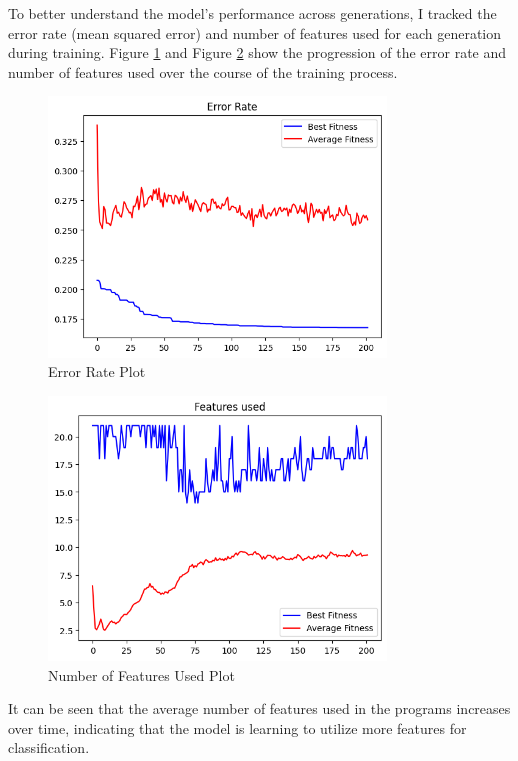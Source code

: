 \documentclass{article}
\begin{document}
To better understand the model's performance across generations, I tracked the error rate (mean squared error) and number of features used for each generation during training. 
Figure \ref{fig:error-rate-plot} and Figure \ref{fig:feature-plot} show the progression of the error rate and number of features used over the course of the training process.
\begin{figure}[h] 
    \centering 
    \includegraphics[width=0.8\textwidth]{./figures/error-rate-plot.png} 
    \caption{Error Rate Plot} 
    \label{fig:error-rate-plot}
\end{figure}
\begin{figure}[h] 
    \centering 
    \includegraphics[width=0.8\textwidth]{./figures/feature-used-plot.png} 
    \caption{Number of Features Used Plot} 
    \label{fig:feature-plot}
\end{figure}
It can be seen that the average number of features used in the programs increases over time, indicating that the model is learning to utilize more features for classification.
\end{document}
